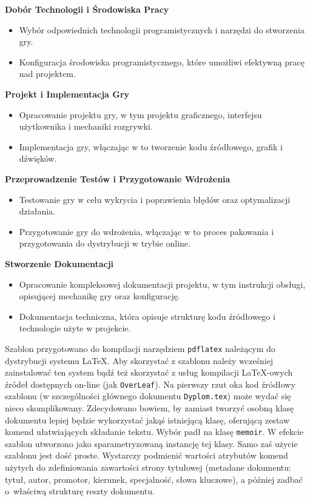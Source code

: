 \textbf{Dobór Technologii i Środowiska Pracy}
\begin{itemize}
	\item Wybór odpowiednich technologii programistycznych i narzędzi do stworzenia gry.
	\item Konfiguracja środowiska programistycznego, które umożliwi efektywną pracę nad projektem.
\end{itemize}

\textbf{Projekt i Implementacja Gry}
\begin{itemize}
	\item Opracowanie projektu gry, w tym projektu graficznego, interfejsu użytkownika i mechaniki rozgrywki.
	\item Implementacja gry, włączając w to tworzenie kodu źródłowego, grafik i dźwięków.
\end{itemize}

\textbf{Przeprowadzenie Testów i Przygotowanie Wdrożenia}
\begin{itemize}
	\item Testowanie gry w celu wykrycia i poprawienia błędów oraz optymalizacji działania.
	\item Przygotowanie gry do wdrożenia, włączając w to proces pakowania i przygotowania do dystrybucji w trybie online.
\end{itemize}



\textbf{Stworzenie Dokumentacji}
\begin{itemize}
	\item Opracowanie kompleksowej dokumentacji projektu, w tym instrukcji obsługi, opisującej mechanikę gry oraz konfigurację.
	\item Dokumentacja techniczna, która opisuje strukturę kodu źródłowego i technologie użyte w projekcie.
\end{itemize}



Szablon przygotowano do kompilacji narzędziem \texttt{pdflatex} należącym do dystrybucji systemu \LaTeX. Aby skorzystać z szablonu należy wcześniej zainstalować ten system  bądź też skorzystać z usług kompilacji \LaTeX-owych źródeł dostępnych on-line (jak \texttt{OverLeaf}). Na pierwszy rzut oka kod źródłowy szablonu (w szczególności głównego dokumentu \texttt{Dyplom.tex}) może wydać się nieco skomplikowany. Zdecydowano bowiem, by zamiast tworzyć osobną klasę dokumentu lepiej będzie wykorzystać jakąś istniejącą klasę, oferującą zestaw komend ułatwiających składanie tekstu. Wybór padł na klasę \texttt{memoir}. W efekcie szablon utworzono jako sparametryzowaną instancję tej klasy. 
Samo zaś użycie szablonu jest dość proste. Wystarczy podmienić wartości atrybutów komend użytych do zdefiniowania zawartości strony tytułowej (metadane dokumentu: tytuł, autor, promotor, kierunek, specjalność, słowa kluczowe), a później zadbać o~właściwą strukturę reszty dokumentu. 

